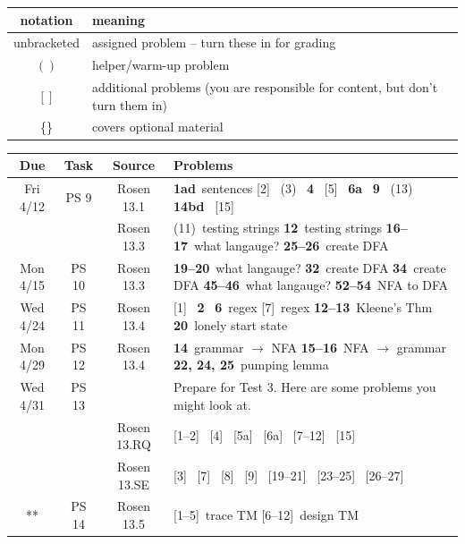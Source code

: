 \documentclass{scrartcl}\usepackage[]{graphicx}\usepackage[]{color}
\def\hwn#1{\relax}
\def\hwn#1{\ {\tiny (#1)}}
\def\hwn#1{$_{\mbox{\ \tiny #1}}$}
\def\hwn#1{~{\tiny #1}}
\newcommand{\helper}[2][\relax]{(#2)\hwn{#1}}
\newcommand{\extra}[2][\relax]{[#2]\hwn{#1}}
\newcommand{\mand}[2][\relax]{{\bf \large #2}\hwn{#1}}
\begin{document}
\begin{center}

\iftrue

\begin{longtable}{|c|l|}
  \hline
  notation & meaning \\
  \hline
  unbracketed & assigned problem -- turn these in for grading \\
  $()$ & helper/warm-up problem  \\
  $[]$ & additional problems (you are responsible for content, but don't turn them in) \\
  \{\} & covers optional material \\
  \hline
\end{longtable}
\fi

\bigskip


\begin{longtable}{|c|c|c|p{4.3in}|}
  \hline
  Due & Task & Source & Problems \\
  \hline\hline
  \endhead
  Fri 4/12 & PS 9 & Rosen 13.1 &
   \mand[sentences]{1ad}
	 \extra{2}
	 \helper{3}
	 \mand{4}
	 \extra{5}
	 \mand{6a}
	 \mand{9}
	 \helper{13}
	 \mand{14bd}
	 \extra{15}


   \\
	   & & Rosen 13.3 &
	   \helper[testing strings]{11}
	   \mand[testing strings]{12}
	   \mand[what langauge?]{16--17}
	   \mand[create DFA]{25--26}
   \\
   \hline
	   Mon 4/15 & PS 10 & Rosen 13.3 &
	   \mand[what langauge?]{19--20}
	   \mand[create DFA]{32}
	   \mand[create DFA]{34}
	   \mand[what langauge?]{45--46}
	   \mand[NFA to DFA]{52--54}
   \\
	   \hline
	   Wed 4/24 & PS 11 & Rosen 13.4 &
	   \extra{1}
	   \mand{2}
	   \mand[regex]{6}
	   \extra[regex]{7}
	   \mand[Kleene's Thm]{12--13}
	   \mand[lonely start state]{20}
   \\
	   \hline
	   Mon 4/29 & PS 12 & Rosen 13.4 &
	   \mand[grammar $\to$ NFA]{14}
	   \mand[NFA $\to$ grammar]{15--16}
	   \mand[pumping lemma]{22, 24, 25}
   \\
	   \hline
	   	  Wed 4/31 & PS 13 & &
	  Prepare for Test 3.  Here are some problems you might look at.
	  \\
   & & Rosen 13.RQ &
   \extra{1--2}
   \extra{4}
   \extra{5a}
   \extra{6a}
   \extra{7--12}
   \extra{15}
   \\
   & & Rosen 13.SE &
   \extra{3}
   \extra{7}
   \extra{8}
   \extra{9}
   \extra{19--21}
   \extra{23--25}
   \extra{26--27}
   	   \\
	   \hline
	  ** & PS 14 & Rosen 13.5 &
	  \extra[trace TM]{1--5}
	  \extra[design TM]{6--12}
	   \\
	   \hline
   \end{longtable}
   \end{center}
   
\end{document}

